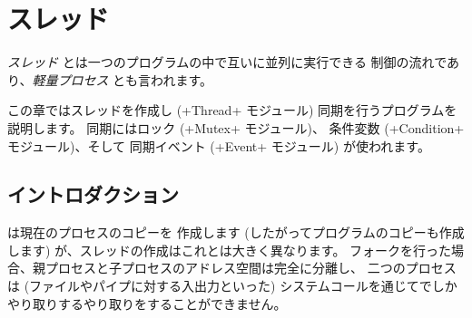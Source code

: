 %
%

\chapter{\label{sec/coprocessus}スレッド}

\emph{スレッド} とは一つのプログラムの中で互いに並列に実行できる
制御の流れであり、\emph{軽量プロセス} とも言われます。

この章ではスレッドを作成し (\ml+Thread+ モジュール) 同期を行うプログラムを説明します。
同期にはロック (\ml+Mutex+ モジュール)、 条件変数 (\ml+Condition+ モジュール)、そして
同期イベント (\ml+Event+ モジュール) が使われます。

\section{イントロダクション}

 は現在のプロセスのコピーを
作成します (したがってプログラムのコピーも作成します) が、スレッドの作成はこれとは大きく異なります。
フォークを行った場合、親プロセスと子プロセスのアドレス空間は完全に分離し、
二つのプロセスは (ファイルやパイプに対する入出力といった) システムコールを通じてでしか
やり取りするやり取りをすることができません。

